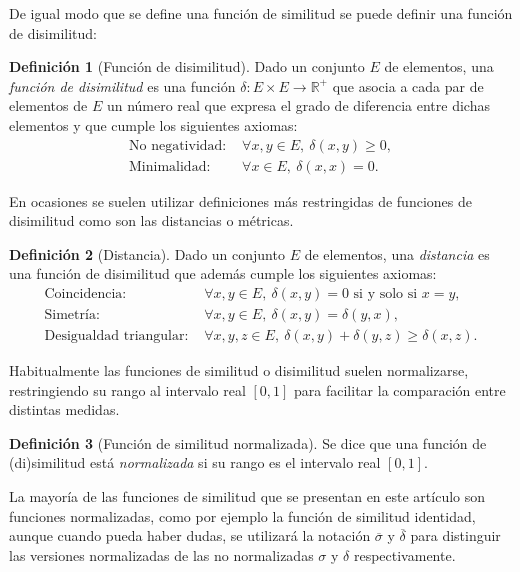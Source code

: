 \documentclass[a4paper,10pt,twoside]{article}
\theoremstyle{definition}
\newtheorem{definition}{Definición}
\begin{document}
De igual modo que se define una función de similitud se puede definir una función de disimilitud:
\begin{definition}[Función de disimilitud]
Dado un conjunto $E$ de elementos, una \emph{función de disimilitud} es una función $\delta:E\times E \longrightarrow
\mathbb{R}^+$ que asocia a cada par de elementos de $E$ un número real que expresa el grado de diferencia entre dichas elementos y que cumple los siguientes axiomas:
\begin{align*}
    \textrm{No negatividad: }& \forall x,y \in E,\ \delta(x,y)\geq 0,\\
    \textrm{Minimalidad: }& \forall x \in E,\ \delta(x,x)=0.
\end{align*}
\end{definition}

En ocasiones se suelen utilizar definiciones más restringidas de funciones de disimilitud como son las distancias o métricas.

\begin{definition}[Distancia]
Dado un conjunto $E$ de elementos, una \emph{distancia} es una función de disimilitud que además cumple los siguientes axiomas:
\begin{align*}
    \textrm{Coincidencia: } & \forall x,y \in E,\ \delta(x,y)= 0\textrm{ si y solo si  }x=y,\\
    \textrm{Simetría: } & \forall x,y \in E,\ \delta(x,y) = \delta(y,x),\\
    \textrm{Desigualdad triangular: }& \forall x,y,z \in E,\ \delta(x,y)+\delta(y,z)\geq \delta(x,z).
\end{align*}
\end{definition}

Habitualmente las funciones de similitud o disimilitud suelen normalizarse, restringiendo su rango al intervalo real $[0,1]$ para facilitar la comparación entre distintas medidas.

\begin{definition}[Función de similitud normalizada]
Se dice que una función de (di)similitud está \emph{normalizada} si su rango es el intervalo real $[0,1]$.
\end{definition}

La mayoría de las funciones de similitud que se presentan en este artículo son funciones normalizadas, como por ejemplo la función de similitud identidad, aunque cuando pueda haber dudas, se utilizará la notación $\overline{\sigma}$ y $\overline{\delta}$ para distinguir las versiones normalizadas de las no normalizadas $\sigma$ y $\delta$ respectivamente.
\end{document}
